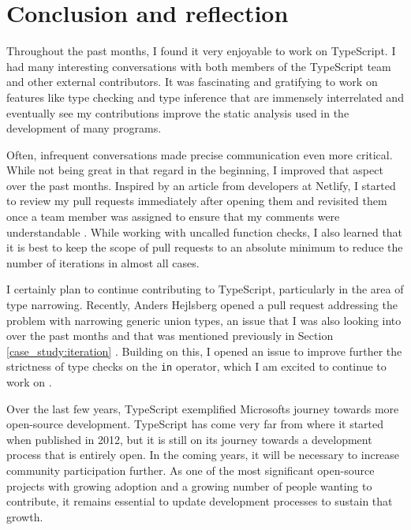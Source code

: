 \documentclass[12pt]{scrartcl}
\def\code#1{\texttt{\frenchspacing#1}}
\begin{document}
\section{Conclusion and reflection}

Throughout the past months, I found it very enjoyable to work on TypeScript. I had many interesting conversations with both members of the TypeScript team and other external contributors. It was fascinating and gratifying to work on features like type checking and type inference that are immensely interrelated and eventually see my contributions improve the static analysis used in the development of many programs.

Often, infrequent conversations made precise communication even more critical. While not being great in that regard in the beginning, I improved that aspect over the past months. Inspired by an article from developers at Netlify, I started to review my pull requests immediately after opening them and revisited them once a team member was assigned to ensure that my comments were understandable \cite{Netlify}. While working with uncalled function checks, I also learned that it is best to keep the scope of pull requests to an absolute minimum to reduce the number of iterations in almost all cases.

I certainly plan to continue contributing to TypeScript, particularly in the area of type narrowing. Recently, Anders Hejlsberg opened a pull request addressing the problem with narrowing generic union types, an issue that I was also looking into over the past months and that was mentioned previously in Section \ref{case_study:iteration} \cite{13995, 43183}. Building on this, I opened an issue to improve further the strictness of type checks on the \code{in} operator, which I am excited to continue to work on \cite{43210}.

Over the last few years, TypeScript exemplified Microsofts journey towards more open-source development. TypeScript has come very far from where it started when published in 2012, but it is still on its journey towards a development process that is entirely open. In the coming years, it will be necessary to increase community participation further. As one of the most significant open-source projects with growing adoption and a growing number of people wanting to contribute, it remains essential to update development processes to sustain that growth.

\clearpage

\printbibliography
\end{document}
